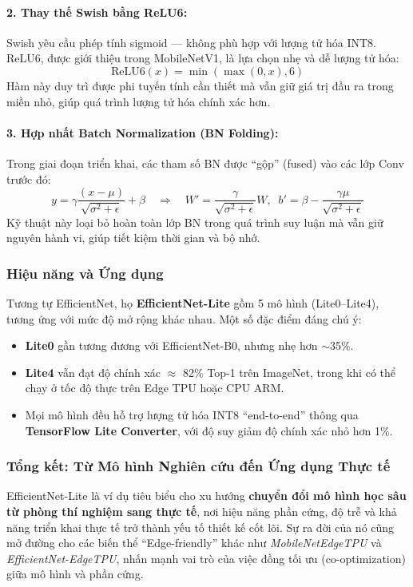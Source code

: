 \paragraph{2. Thay thế Swish bằng ReLU6:}
Swish yêu cầu phép tính sigmoid — không phù hợp với lượng tử hóa INT8.  
ReLU6, được giới thiệu trong MobileNetV1, là lựa chọn nhẹ và dễ lượng tử hóa:
\begin{equation}
	\text{ReLU6}(x) = \min(\max(0, x), 6)
\end{equation}
Hàm này duy trì được phi tuyến tính cần thiết mà vẫn giữ giá trị đầu ra trong miền nhỏ, giúp quá trình lượng tử hóa chính xác hơn.

\paragraph{3. Hợp nhất Batch Normalization (BN Folding):}
Trong giai đoạn triển khai, các tham số BN được “gộp” (fused) vào các lớp Conv trước đó:
\[
y = \gamma \frac{(x - \mu)}{\sqrt{\sigma^2 + \epsilon}} + \beta 
\quad \Rightarrow \quad
W' = \frac{\gamma}{\sqrt{\sigma^2 + \epsilon}} W,\;\;
b' = \beta - \frac{\gamma \mu}{\sqrt{\sigma^2 + \epsilon}}
\]
Kỹ thuật này loại bỏ hoàn toàn lớp BN trong quá trình suy luận mà vẫn giữ nguyên hành vi, giúp tiết kiệm thời gian và bộ nhớ.

\subsubsection{Hiệu năng và Ứng dụng}
Tương tự EfficientNet, họ \textbf{EfficientNet-Lite} gồm 5 mô hình (Lite0–Lite4), tương ứng với mức độ mở rộng khác nhau.  
Một số đặc điểm đáng chú ý:
\begin{itemize}
	\item \textbf{Lite0} gần tương đương với EfficientNet-B0, nhưng nhẹ hơn $\sim$35\%.
	\item \textbf{Lite4} vẫn đạt độ chính xác $\approx$ 82\% Top-1 trên ImageNet, trong khi có thể chạy ở tốc độ thực trên Edge TPU hoặc CPU ARM.
	\item Mọi mô hình đều hỗ trợ lượng tử hóa INT8 “end-to-end” thông qua \textbf{TensorFlow Lite Converter}, với độ suy giảm độ chính xác nhỏ hơn 1\%.
\end{itemize}

\subsubsection{Tổng kết: Từ Mô hình Nghiên cứu đến Ứng dụng Thực tế}
EfficientNet-Lite là ví dụ tiêu biểu cho xu hướng \textbf{chuyển đổi mô hình học sâu từ phòng thí nghiệm sang thực tế}, nơi hiệu năng phần cứng, độ trễ và khả năng triển khai thực tế trở thành yếu tố thiết kế cốt lõi.  
Sự ra đời của nó cũng mở đường cho các biến thể “Edge-friendly” khác như \textit{MobileNetEdgeTPU} và \textit{EfficientNet-EdgeTPU}, nhấn mạnh vai trò của việc đồng tối ưu (co-optimization) giữa mô hình và phần cứng.

